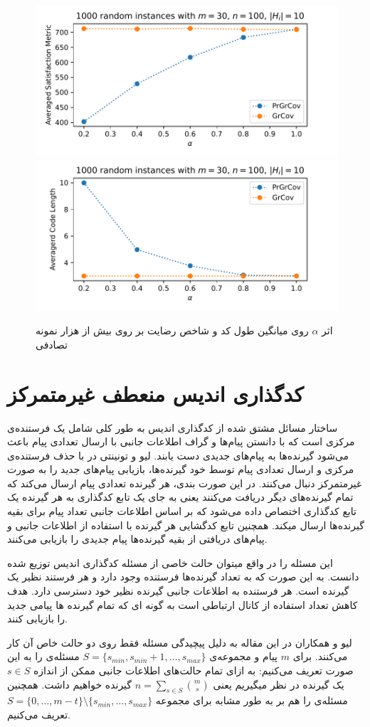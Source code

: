 \begin{figure}[H]
	\centering
	{\includegraphics[width=0.4\linewidth]{figs/chapter4/cost_alpha_grcov_prgrcov.pdf}\vspace{-2ex}}
	{\includegraphics[width=0.4				\linewidth]{figs/chapter4/code_length_alpha_grcov_prgrcov.pdf}\vspace{-2ex}}
	\caption{
		اثر
		$\alpha$
		روی میانگین طول کد و شاخص رضایت بر روی بیش از هزار نمونه تصادفی
}
	\label{fig:alpha}
\end{figure}

\section{کدگذاری اندیس منعطف غیرمتمرکز}
ساختار مسائل مشتق شده از کدگذاری اندیس به طور کلی شامل یک فرستنده‌ی مرکزی است که با دانستن پیام‌ها و گراف اطلاعات جانبی با ارسال تعدادی پیام باعث می‌شود گیرنده‌ها به پیام‌های جدیدی دست یابند. لیو و تونینتی در
\cite{paper:Decentralized}
با حذف فرستنده‌ی مرکزی و ارسال تعدادی پیام توسط خود گیرنده‌ها، بازیابی پیام‌های جدید را به صورت غیرمتمرکز دنبال می‌کنند. در این صورت بندی، هر گیرنده تعدادی پیام ارسال می‌کند که تمام گیرنده‌های دیگر دریافت می‌کنند یعنی به جای یک تابع کدگذاری به هر گیرنده یک تابع کدگذاری اختصاص داده می‌شود که بر اساس اطلاعات جانبی تعداد پیام برای بقیه گیرنده‌ها ارسال میکند. همچنین تابع کدگشایی هر گیرنده با استفاده از اطلاعات جانبی و پیام‌های دریافتی از بقیه گیرنده‌ها پیام جدیدی را بازیابی می‌کنند.

این مسئله را در واقع میتوان حالت خاصی از مسئله کدگذاری اندیس توزیع شده
\cite{9022912}
دانست. به این صورت که به تعداد گیرنده‌ها فرستنده وجود دارد و هر فرستند نظیر یک گیرنده است. هر فرستنده به اطلاعات جانبی گیرنده نظیر خود دسترسی دارد. هدف کاهش تعداد استفاده از کانال ارتباطی است به گونه ای که تمام گیرنده ها پیامی جدید را بازیابی کنند.

لیو و همکاران در این مقاله به دلیل پیچیدگی مسئله فقط روی دو حالت خاص آن کار می‌کنند. برای 
$m$
پیام و مجموعه‌ی
$S = \{s_{min}, s_{min }+ 1, \ldots, s_{max}\}$
مسئله‌ی 
را به این صورت تعریف می‌کنیم: به ازای تمام حالت‌های اطلاعات جانبی ممکن از اندازه
$s \in S$
یک گیرنده در نظر میگیریم یعنی
$n = \sum\limits_{s \in S} \binom{m}{s}$
گیرنده خواهیم داشت. همچنین مسئله‌ی
را هم بر به طور مشابه برای مجموعه
$S = \{0, \ldots, m - t\} \setminus \{s_{min}, \ldots, s_{max}\}$
تعریف می‌کنیم.

